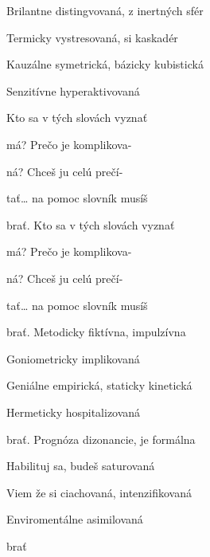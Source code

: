 \begin{song}


\begin{hchordbox}
\end{hchordbox}

\Large

\bigskip


 Brilantne distingvovaná, z inertných sfér \par
{} Termicky vystresovaná, si kaskadér \par
{} Kauzálne symetrická,  bázicky kubistická \par
{} Senzitívne hyperaktivovaná \par

\bigskip

\begin{chorusbox}{\Refren}
 Kto sa v tých slovách vyznať \par
{}má? Prečo je komplikova- \par
{}ná? Chceš ju celú prečí- \par
{}tať… na pomoc slovník musíš \par
{}brať. Kto sa v tých slovách vyznať \par
{}má? Prečo je komplikova- \par
{}ná? Chceš ju celú prečí- \par
{}tať… na pomoc slovník musíš \par
\end{chorusbox}

\bigskip

brať. Metodicky fiktívna, impulzívna \par
{} Goniometricky implikovaná \par
{} Geniálne empirická,  staticky kinetická \par
{} Hermeticky hospitalizovaná \par

\bigskip

\Refren

\bigskip

brať. Prognóza dizonancie, je formálna \par
{} Habilituj sa, budeš saturovaná \par
{} Viem že si ciachovaná,  intenzifikovaná \par
{} Enviromentálne asimilovaná \par

\bigskip

\Refren

\bigskip

brať

\end{song}
